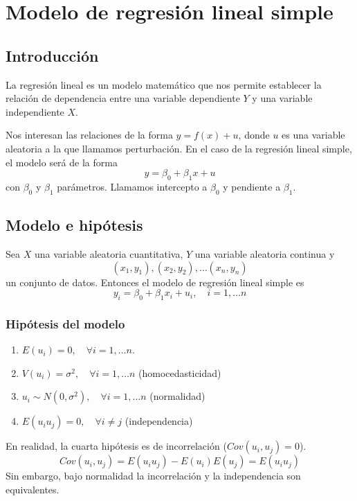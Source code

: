 \chapter{Modelo de regresión lineal simple}
\section{Introducción}

La regresión lineal es un modelo matemático que nos permite establecer la relación de dependencia entre una variable dependiente $Y$ y una variable independiente $X$.

Nos interesan las relaciones de la forma $y = f(x) + u$, donde $u$ es una variable aleatoria a la que llamamos perturbación.
En el caso de la regresión lineal simple, el modelo será de la forma $$y = \beta_0 + \beta_1x + u$$
con $\beta_0$ y $\beta_1$ parámetros.
Llamamos intercepto a $\beta_0$ y pendiente a $\beta_1$.

\section{Modelo e hipótesis}
Sea $X$ una variable aleatoria cuantitativa, $Y$ una variable aleatoria continua y
$$(x_1, y_1), (x_2, y_2), \dots (x_n, y_n)$$
un conjunto de datos.
Entonces el modelo de regresión lineal simple es
$$y_i = \beta_0 + \beta_1x_i + u_i, \quad i = 1, \dots n$$

\subsection*{Hipótesis del modelo}
\begin{enumerate}
    \item $E(u_i) = 0, \quad \forall i = 1, \dots n$.
    \item $V(u_i) = \sigma^2, \quad \forall i = 1, \dots n$ (homocedasticidad)
    \item $u_i \sim N(0, \sigma^2), \quad \forall i = 1, \dots n$ (normalidad)
    \item $E(u_i u_j) = 0, \quad \forall i \neq j$ (independencia)
\end{enumerate}

\begin{note}
    En realidad, la cuarta hipótesis es de incorrelación ($Cov(u_i, u_j) = 0$).
    $$Cov(u_i, u_j) = E(u_i u_j) - E(u_i)E(u_j) = E(u_i u_j)$$
    Sin embargo, bajo normalidad la incorrelación y la independencia son equivalentes.
\end{note}

